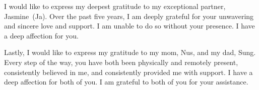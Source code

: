 I would like to express my deepest gratitude to my exceptional partner, Jasmine~(Ja).  Over the past five years, I am deeply grateful for your unwavering and sincere love and support. I am unable to do so without your presence.  I have a deep affection for you.

Lastly, I would like to express my gratitude to my mom, Nus, and my dad, Sung.  Every step of the way, you have both been physically and remotely present, consistently believed in me, and consistently provided me with support.  I have a deep affection for both of you.  I am grateful to both of you for your assistance.

\newpage
\setcounter{tocdepth}{2}
\tableofcontents
\newpage
\thispagestyle{plain}
{}
\listoffigures
\newpage
\thispagestyle{plain}
{}
\listoftables
\newpage


%
%




\newpage



